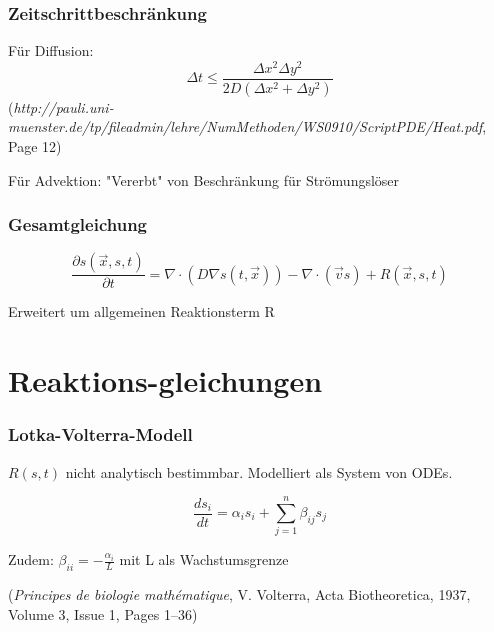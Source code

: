 \documentclass[12pt]{beamer}
\begin{document}
    \begin{frame}
      \frametitle{Zeitschrittbeschränkung}
      Für Diffusion:
      $$\Delta t \leq \frac{\Delta x^2 \Delta y^2}{2D(\Delta x^2 + \Delta y^2)}$$
      {\tiny (\emph{http://pauli.uni-muenster.de/tp/fileadmin/lehre/NumMethoden/WS0910/ScriptPDE/Heat.pdf}, Page 12)}
      
      Für Advektion: "Vererbt" von Beschränkung für Strömungslöser
    \end{frame}

  \begin{frame}
    \frametitle{Gesamtgleichung}
    $$\frac{\partial s(\vec{x},s,t)}{\partial t} = \nabla \cdot (D \nabla s(t,\vec{x})) - \nabla \cdot (\vec{v}s) + R(\vec{x},s,t)$$
    
    Erweitert um allgemeinen Reaktionsterm R
  \end{frame}

  \section{Reaktions-gleichungen}
    \begin{frame}
    \frametitle{Lotka-Volterra-Modell}
    $R(s,t)$ nicht analytisch bestimmbar. Modelliert als System von ODEs.
    
    $$\frac{ds_i}{dt} = \alpha_i s_i + \sum_{j=1}^{n} \beta_{ij} s_j$$
    
    Zudem: $\beta_{ii} = -\frac{\alpha_i}{L}$ mit L als Wachstumsgrenze
    
    {\tiny (\emph{Principes de biologie mathématique}, V. Volterra, Acta Biotheoretica, 1937, Volume 3, Issue 1, Pages 1–36)}
    \end{frame}
    
\end{document}
